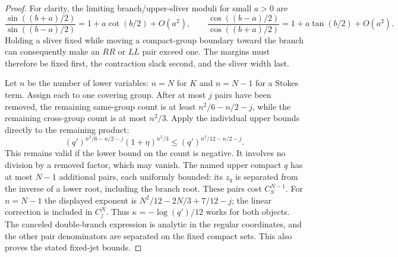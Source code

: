 \documentclass[11pt]{article}
\numberwithin{equation}{section}
\theoremstyle{definition}
\begin{document}
\begin{proof}
For clarity, the limiting branch/upper-sliver moduli for small
\(a>0\) are
\[
 \frac{\sin((b+a)/2)}{\sin((b-a)/2)}
   =1+a\cot(b/2)+O(a^2),\qquad
 \frac{\cos((b-a)/2)}{\cos((b+a)/2)}
   =1+a\tan(b/2)+O(a^2).
\]
Holding a sliver fixed while moving a compact-group boundary
toward the branch can consequently make an \(RR\) or \(LL\)
pair exceed one. The margins must therefore be fixed first, the contraction slack second,
and the sliver width last.

Let \(n\) be the number of lower variables: \(n=N\) for \(K\)
and \(n=N-1\) for a Stokes term. Assign each to one covering group.
After at most \(j\) pairs have been removed, the remaining
same-group count is at least \(n^2/6-n/2-j\), while the
remaining cross-group count is at most \(n^2/3\). Apply the
individual upper bounds directly to the remaining product:
\[
 (q')^{n^2/6-n/2-j}(1+\eta)^{n^2/3}
       \le(q')^{n^2/12-n/2-j}.
\]
This remains valid if the lower bound on the count is negative.
It involves no division by a removed factor, which may vanish.
The named upper compact
\(q\) has at most \(N-1\) additional pairs, each uniformly
bounded: its \(z_q\) is separated from the inverse of a lower
root, including the branch root. These pairs cost \(C_S^{N-1}\).
For \(n=N-1\) the displayed exponent is
\(N^2/12-2N/3+7/12-j\); the linear correction is included in
\(C_j^N\). Thus \(\kappa=-\log(q')/12\) works for both objects.
The canceled double-branch expression is analytic in the regular
coordinates, and the other pair denominators are separated on the
fixed compact sets. This also proves the stated fixed-jet bounds.
\end{proof}
\end{document}
